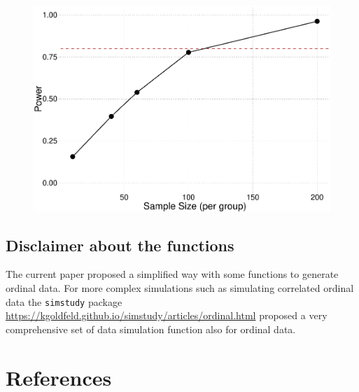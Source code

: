 \documentclass[
  man,floatsintext]{apa6}
\begin{document}
\begin{figure}

{\centering \includegraphics{paper-new_files/figure-latex/unnamed-chunk-26-1} 

}

\caption{ }\label{fig:unnamed-chunk-26}
\end{figure}

\normalsize

\subsection{Disclaimer about the functions}\label{disclaimer-about-the-functions}

The current paper proposed a simplified way with some functions to generate ordinal data. For more complex simulations such as simulating correlated ordinal data the \texttt{simstudy} package \url{https://kgoldfeld.github.io/simstudy/articles/ordinal.html} proposed a very comprehensive set of data simulation function also for ordinal data.

\newpage

\section{References}\label{references}
\end{document}
